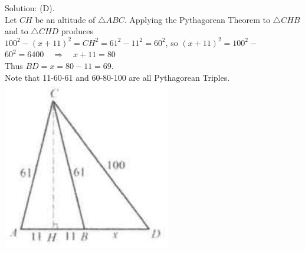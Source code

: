 \documentclass{article}
\begin{document}
Solution: (D).\\
Let \(C H\) be an altitude of \(\triangle A B C\). Applying the Pythagorean Theorem to \(\triangle C H B\) and to \(\triangle C H D\) produces\\
\(100^{2}-(x+11)^{2}=C H^{2}=61^{2}-11^{2}=60^{2}\), so \((x+11)^{2}=100^{2}-\) \(60^{2}=6400 \quad \Rightarrow \quad x+11=80\)\\
Thus \(B D=x=80-11=69\).\\
Note that 11-60-61 and 60-80-100 are all Pythagorean Triples.\\
\centering
\includegraphics[width=\textwidth]{images/reasoning_image_1.jpg}
\end{document}
